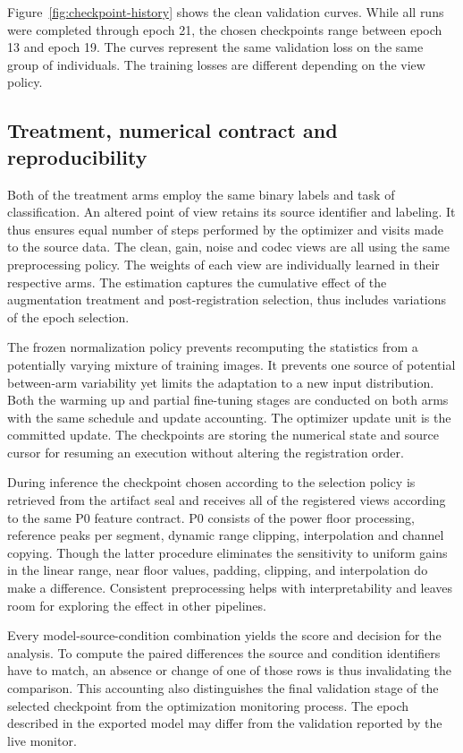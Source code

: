 Figure~\ref{fig:checkpoint-history} shows the clean validation curves. While all runs were completed through epoch 21, the chosen checkpoints range between epoch 13 and epoch 19. The curves represent the same validation loss on the same group of individuals. The training losses are different depending on the view policy.

\subsection{Treatment, numerical contract and reproducibility}

Both of the treatment arms employ the same binary labels and task of classification. An altered point of view retains its source identifier and labeling. It thus ensures equal number of steps performed by the optimizer and visits made to the source data. The clean, gain, noise and codec views are all using the same preprocessing policy. The weights of each view are individually learned in their respective arms. The estimation captures the cumulative effect of the augmentation treatment and post-registration selection, thus includes variations of the epoch selection.

The frozen normalization policy prevents recomputing the statistics from a potentially varying mixture of training images. It prevents one source of potential between-arm variability yet limits the adaptation to a new input distribution. Both the warming up and partial fine-tuning stages are conducted on both arms with the same schedule and update accounting. The optimizer update unit is the committed update. The checkpoints are storing the numerical state and source cursor for resuming an execution without altering the registration order.

During inference the checkpoint chosen according to the selection policy is retrieved from the artifact seal and receives all of the registered views according to the same P0 feature contract. P0 consists of the power floor processing, reference peaks per segment, dynamic range clipping, interpolation and channel copying. Though the latter procedure eliminates the sensitivity to uniform gains in the linear range, near floor values, padding, clipping, and interpolation do make a difference. Consistent preprocessing helps with interpretability and leaves room for exploring the effect in other pipelines.

Every model-source-condition combination yields the score and decision for the analysis. To compute the paired differences the source and condition identifiers have to match, an absence or change of one of those rows is thus invalidating the comparison. This accounting also distinguishes the final validation stage of the selected checkpoint from the optimization monitoring process. The epoch described in the exported model may differ from the validation reported by the live monitor.

